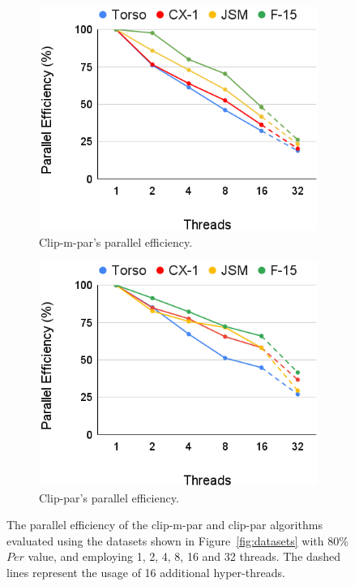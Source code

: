 \documentclass{egpubl}
\begin{document}
\begin{figure}[b]
  \centering
  \begin{subfigure}[t]{0.49\linewidth}
    \centering
    \includegraphics[width=\linewidth]{Figures/Parallel-Efficiency-clip-m-par.png}
    \caption{Clip-m-par's parallel efficiency.}
    \label{fig:par-efficiency-clip-m-par}
  \end{subfigure}
  \begin{subfigure}[t]{0.49\linewidth}
    \centering
    \includegraphics[width=\linewidth]{Figures/Parallel-Efficiency-clip-par.png}
    \caption{Clip-par's parallel efficiency.}
    \label{fig:par-efficiency-clip-par}
   \end{subfigure}
   \caption{The parallel efficiency of the clip-m-par and clip-par algorithms evaluated using the datasets shown in Figure~\ref{fig:datasets} with 80\% $Per$ value, and employing 1, 2, 4, 8, 16 and 32 threads. The dashed lines represent the usage of 16 additional hyper-threads.}
   \label{fig:par-efficiency}
\end{figure}
\end{document}
